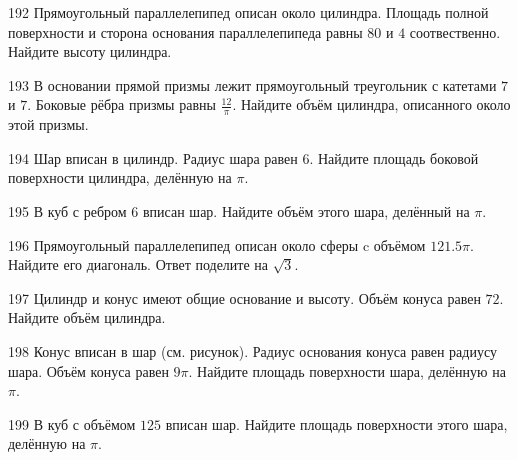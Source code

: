 \documentclass[4apaper]{article}
\begin{document}
\begin{taskBN}{192}
Прямоугольный параллелепипед описан около цилиндра. Площадь полной поверхности и сторона основания параллелепипеда равны $80$ и $4$ соотвественно. Найдите высоту цилиндра.
\end{taskBN}

\begin{taskBN}{193}
В основании прямой призмы лежит прямоугольный треугольник с катетами $7$ и $7$. Боковые рёбра призмы равны $\frac{12}{\pi}$. Найдите объём цилиндра, описанного около этой призмы.
\end{taskBN}

\begin{taskBN}{194}
Шар вписан в цилиндр. Радиус шара равен $6$. Найдите площадь боковой поверхности цилиндра, делённую на $\pi$.
\end{taskBN}

\begin{taskBN}{195}
В куб с ребром $6$ вписан шар. Найдите объём этого шара, делённый на $\pi$.
\end{taskBN}

\begin{taskBN}{196}
Прямоугольный параллелепипед описан около сферы c объёмом $121.5$$\pi$. Найдите его диагональ. Ответ поделите на $\sqrt{3}$.
\end{taskBN}

\begin{taskBN}{197}
Цилиндр и конус имеют общие основание и высоту. Объём конуса равен $72$. Найдите объём цилиндра.
\end{taskBN}

\begin{taskBN}{198}
Конус вписан в шар (см. рисунок).  Радиус основания конуса равен радиусу шара. Объём конуса равен $9\pi$. Найдите площадь поверхности шара, делённую на $\pi$.
\end{taskBN}

\begin{taskBN}{199}
В куб с объёмом $125$ вписан шар. Найдите площадь поверхности этого шара, делённую на $\pi$.
\end{taskBN}
\end{document}
